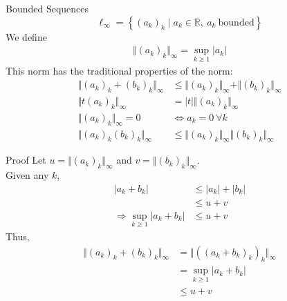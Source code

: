 \documentclass[10pt]{extarticle}
\newcommand{\R}{\mathbb{R}}
\begin{document}
  \begin{problem}{Bounded Sequences}
    \[
      \ell_{\infty} = \left\{(a_k)_k \mid a_k\in\R,~a_k~\text{bounded}\right\}
    \] 
    We define
    \begin{align*}
      \Vert(a_k)_k\Vert_{\infty} = \sup_{k\geq 1}|a_k|\tag*{Infinity Norm}
    \end{align*}
    This norm has the traditional properties of the norm:
    \begin{align*}
      \Vert (a_k)_k + (b_k)_k\Vert_{\infty} &\leq \Vert(a_k)_k\Vert_{\infty} + \Vert(b_k)_k\Vert_{\infty}\tag*{Triangle Inequality}\\
      \Vert t(a_k)_k\Vert_{\infty} &= |t|\Vert(a_k)_k\Vert_{\infty}\tag*{Scalar Multiplication}\\
      \Vert(a_k)_k\Vert_{\infty} = 0 &\Leftrightarrow a_k = 0~\forall k\tag*{Zero Property}\\
      \Vert(a_k)_k(b_k)_k\Vert_{\infty} &\leq \Vert(a_k)_k\Vert_{\infty}\Vert(b_k)_k\Vert_{\infty}\tag*{Multiplication}
    \end{align*}
    \begin{problem}{Proof}
      Let $u = \Vert(a_k)_k\Vert_{\infty}$ and $v = \Vert(b_k)_k\Vert_{\infty}$.\\

      Given any $k$,
      \begin{align*}
        |a_k + b_k| &\leq |a_k| + |b_k| \tag*{Triangle Inequality on $|\cdot|$}\\
                    &\leq u+v \tag*{definition of supremum}\\
        \Rightarrow \sup_{k\geq 1}|a_k + b_k|&\leq u+v
      \end{align*}
      Thus,
      \begin{align*}
        \Vert (a_k)_k + (b_k)_k\Vert_{\infty} &= \Vert \left((a_k + b_k)_k\right)_k\Vert_{\infty}\\
                                              &= \sup_{k\geq 1}|a_k + b_k|\\
                                              &\leq u+v
      \end{align*}
    \end{problem}
  \end{problem}
\end{document}
